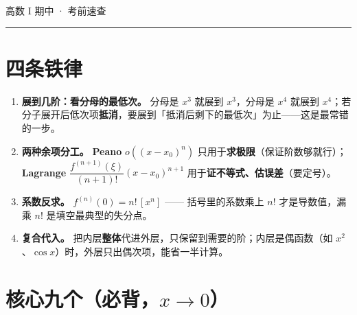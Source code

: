 \documentclass[11pt,UTF8]{ctexart}
\begin{document}
\hfill{\small 高数 I 期中 · 考前速查}


\vspace{2pt}\hrule\vspace{8pt}



\section{四条铁律}

\begin{keypoint}
\begin{enumerate}[leftmargin=1.7em,itemsep=3pt]
\item \textbf{展到几阶：看分母的最低次。} 分母是 $x^{3}$ 就展到 $x^{3}$，分母是 $x^{4}$ 就展到 $x^{4}$；若分子展开后低次项\textbf{抵消}，要展到「抵消后剩下的最低次」为止——这是最常错的一步。
\item \textbf{两种余项分工。} \textbf{Peano} $o((x-x_0)^n)$ 只用于\textbf{求极限}（保证阶数够就行）；\textbf{Lagrange} $\dfrac{f^{(n+1)}(\xi)}{(n+1)!}(x-x_0)^{n+1}$ 用于\textbf{证不等式、估误差}（要定号）。
\item \textbf{系数反求。} $f^{(n)}(0)=n!\,[x^{n}]$ —— 括号里的系数乘上 $n!$ 才是导数值，漏乘 $n!$ 是填空最典型的失分点。
\item \textbf{复合代入。} 把内层\textbf{整体}代进外层，只保留到需要的阶；内层是偶函数（如 $x^{2}$、$\cos x$）时，外层只出偶次项，能省一半计算。
\end{enumerate}
\end{keypoint}

\section{\texorpdfstring{核心九个（必背，$x\to0$）}{核心九个（必背，x 趋于 0）}}
\end{document}

